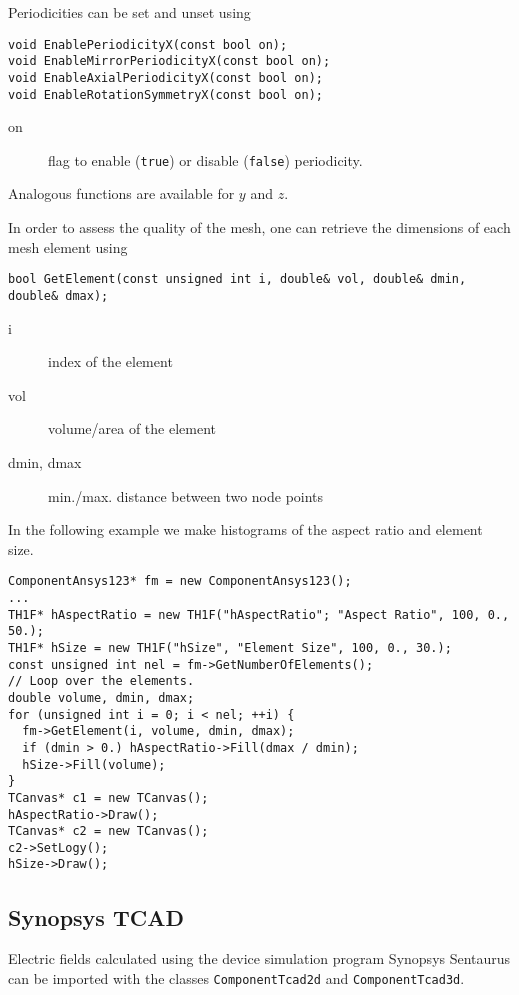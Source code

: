 Periodicities can be set and unset using
\begin{lstlisting}
void EnablePeriodicityX(const bool on);
void EnableMirrorPeriodicityX(const bool on);
void EnableAxialPeriodicityX(const bool on);
void EnableRotationSymmetryX(const bool on);
\end{lstlisting}
\begin{description}
\item[on] flag to enable (\texttt{true}) or disable (\texttt{false}) periodicity. 
\end{description}
Analogous functions are available for \(y\) and \(z\).

In order to assess the quality of the mesh, 
one can retrieve the dimensions of each mesh element using
\begin{lstlisting}
bool GetElement(const unsigned int i, double& vol, double& dmin, double& dmax);
\end{lstlisting}
\begin{description}
\item[i] index of the element
\item[vol] volume/area of the element
\item[dmin, dmax] min./max. distance between two node points
\end{description}

In the following example we make histograms of the aspect ratio and 
element size.
\begin{lstlisting}
ComponentAnsys123* fm = new ComponentAnsys123();
...
TH1F* hAspectRatio = new TH1F("hAspectRatio"; "Aspect Ratio", 100, 0., 50.);
TH1F* hSize = new TH1F("hSize", "Element Size", 100, 0., 30.);
const unsigned int nel = fm->GetNumberOfElements();
// Loop over the elements.
double volume, dmin, dmax;
for (unsigned int i = 0; i < nel; ++i) {
  fm->GetElement(i, volume, dmin, dmax);
  if (dmin > 0.) hAspectRatio->Fill(dmax / dmin);
  hSize->Fill(volume);
}
TCanvas* c1 = new TCanvas();
hAspectRatio->Draw();
TCanvas* c2 = new TCanvas();
c2->SetLogy();
hSize->Draw();
\end{lstlisting}

\subsection{Synopsys TCAD}

Electric fields calculated using the device simulation program 
Synopsys Sentaurus \cite{Synopsys} can be imported with the classes 
\texttt{ComponentTcad2d} and \texttt{ComponentTcad3d}.

